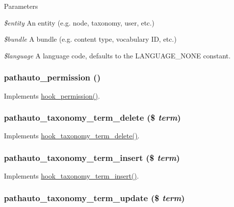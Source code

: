 \begin{DoxyParams}{Parameters}
\item[{\em \$entity}]An entity (e.g. node, taxonomy, user, etc.) \item[{\em \$bundle}]A bundle (e.g. content type, vocabulary ID, etc.) \item[{\em \$language}]A language code, defaults to the LANGUAGE\_\-NONE constant. \end{DoxyParams}
\hypertarget{pathauto_8module_ae4a5383114e3ed0695e109bbde6590ca}{
\subsubsection[{pathauto\_\-permission}]{\setlength{\rightskip}{0pt plus 5cm}pathauto\_\-permission ()}}
\label{pathauto_8module_ae4a5383114e3ed0695e109bbde6590ca}
Implements \hyperlink{group__hooks_ga2b22b45f4925f2478412477bae329713}{hook\_\-permission()}. \hypertarget{pathauto_8module_a8ac059064afc0e0a3a6f6e8e3820a2fa}{
\subsubsection[{pathauto\_\-taxonomy\_\-term\_\-delete}]{\setlength{\rightskip}{0pt plus 5cm}pathauto\_\-taxonomy\_\-term\_\-delete (\$ {\em term})}}
\label{pathauto_8module_a8ac059064afc0e0a3a6f6e8e3820a2fa}
Implements \hyperlink{group__hooks_gab55fa1f290f3d43ea59795123154cf32}{hook\_\-taxonomy\_\-term\_\-delete()}. \hypertarget{pathauto_8module_a835922153a91d17a66c4258256017e39}{
\subsubsection[{pathauto\_\-taxonomy\_\-term\_\-insert}]{\setlength{\rightskip}{0pt plus 5cm}pathauto\_\-taxonomy\_\-term\_\-insert (\$ {\em term})}}
\label{pathauto_8module_a835922153a91d17a66c4258256017e39}
Implements \hyperlink{group__hooks_gabab3537accc8ce17fe2cd0f73f4bb817}{hook\_\-taxonomy\_\-term\_\-insert()}. \hypertarget{pathauto_8module_ab861a0bd8ac0d1116d50dc5e446e510b}{
\subsubsection[{pathauto\_\-taxonomy\_\-term\_\-update}]{\setlength{\rightskip}{0pt plus 5cm}pathauto\_\-taxonomy\_\-term\_\-update (\$ {\em term})}}
